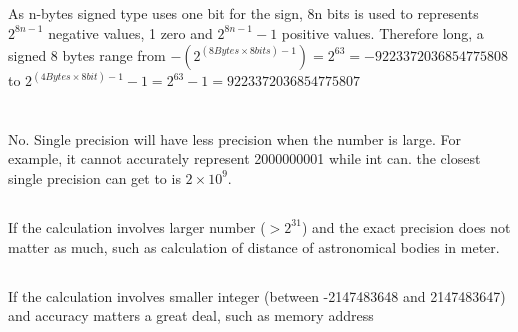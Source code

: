 \documentclass{article}
\begin{document}
\subsection{}
\subsection{}
As n-bytes signed type uses one bit for the sign, 8n bits is used to represents $2^{8n-1}$ negative values, 1 zero and $2^{8n-1}-1$ positive values. Therefore long, a signed 8 bytes range from $-(2^{(8Bytes\times8bits)-1})=2^{63}=-9223372036854775808$ to $2^{(4Bytes\times8bit)-1}-1=2^{63}-1=9223372036854775807$

\section{}
\subsection{}
No. Single precision will have less precision when the number is large. For example, it cannot accurately represent 2000000001 while int can. the closest single precision can get to is $2\times10^9$.
\subsection{}
If the calculation involves larger number ($>2^{31}$) and the exact precision does not matter as much, such as calculation of distance of astronomical bodies in meter.
\subsection{}
If the calculation involves smaller integer (between -2147483648 and 2147483647) and accuracy matters a great deal, such as memory address
\end{document}
